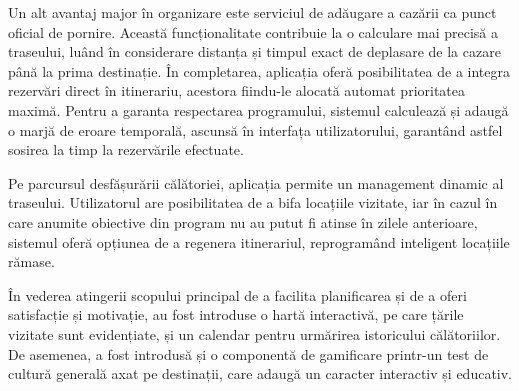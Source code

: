 Un alt avantaj major în organizare este serviciul de adăugare a cazării ca punct oficial de pornire. Această funcționalitate contribuie la o calculare mai precisă a traseului, luând în considerare distanța și timpul exact de deplasare de la cazare până la prima destinație. În completarea, aplicația oferă posibilitatea de a integra rezervări direct în itinerariu, acestora fiindu-le alocată automat prioritatea maximă. Pentru a garanta respectarea programului, sistemul calculează și adaugă o marjă de eroare temporală, ascunsă în interfața utilizatorului, garantând astfel sosirea la timp la rezervările efectuate.

Pe parcursul desfășurării călătoriei, aplicația permite un management dinamic al traseului. Utilizatorul are posibilitatea de a bifa locațiile vizitate, iar în cazul în care anumite obiective din program nu au putut fi atinse în zilele anterioare, sistemul oferă opțiunea de a regenera itinerariul, reprogramând inteligent locațiile rămase. 

În vederea atingerii scopului principal de a facilita planificarea și de a oferi satisfacție și motivație, au fost introduse o hartă interactivă, pe care țările vizitate sunt evidențiate, și un calendar pentru urmărirea istoricului călătoriilor. De asemenea, a fost introdusă și o componentă de gamificare printr-un test de cultură generală axat pe destinații, care adaugă un caracter interactiv și educativ.
